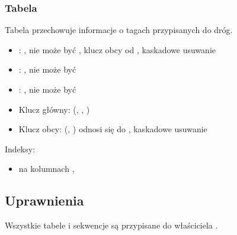 \subsubsection{Tabela }
Tabela przechowuje informacje o tagach przypisanych do dróg.
\begin{itemize}
    \item {}: , nie może być , klucz obcy od , kaskadowe usuwanie
    \item {}: , nie może być 
    \item {}: , nie może być 
    \item Klucz główny: (, , )
    \item Klucz obcy: (, ) odnosi się do , kaskadowe usuwanie
\end{itemize}
Indeksy:
\begin{itemize}
    \item {} na kolumnach , 
\end{itemize}

\subsection{Uprawnienia}
Wszystkie tabele i sekwencje są przypisane do właściciela .
